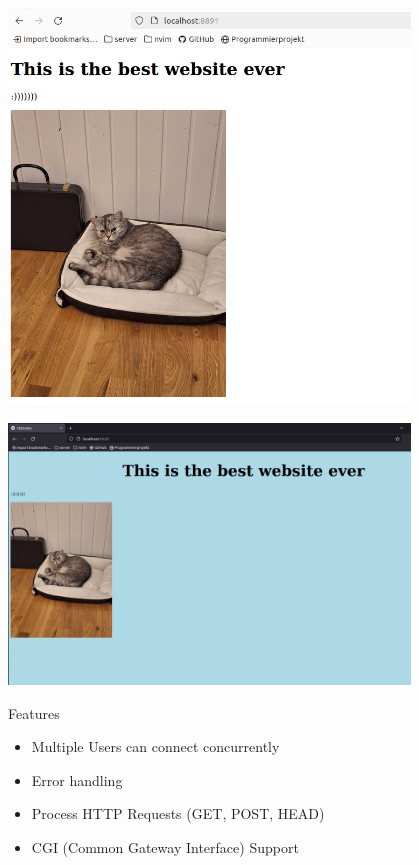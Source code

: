 \documentclass[aspectratio=169]{beamer}
\begin{document}
\begin{frame}[c]{}
  \centering
\includegraphics[width=0.8\textwidth,height=\textheight,keepaspectratio]{03_html_mit_bild.png}
\end{frame}

\begin{frame}[c]{}
  \centering
\includegraphics[width=0.8\textwidth,height=\textheight,keepaspectratio]{04_somecss.png}
\end{frame}

\begin{frame}[c]{Features}
   \begin{itemize}
       \item Multiple Users can connect concurrently 
       \item Error handling 
       \item Process HTTP Requests (GET, POST, HEAD)
       \item CGI (Common Gateway Interface) Support
   \end{itemize} 
\end{frame}
\end{document}
